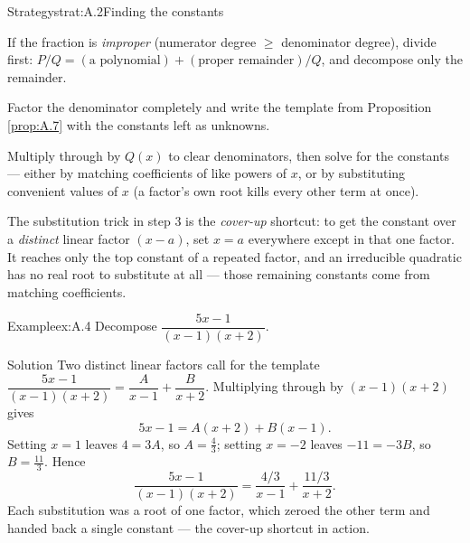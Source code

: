 \documentclass[a4paper,12pt,oneside]{memoir}
\begin{document}
\begin{envstrategy}{Strategy}{strat:A.2}{Finding the constants}
\begin{steps}
  \item If the fraction is \emph{improper} (numerator degree \(\ge\) denominator degree), divide first: \(P/Q = (\text{a polynomial}) + (\text{proper remainder})/Q\), and decompose only the remainder.
  \item Factor the denominator completely and write the template from Proposition \ref{prop:A.7} with the constants left as unknowns.
  \item Multiply through by \(Q(x)\) to clear denominators, then solve for the constants — either by matching coefficients of like powers of \(x\), or by substituting convenient values of \(x\) (a factor’s own root kills every other term at once).
\end{steps}
\begin{informal}
The substitution trick in step 3 is the \emph{cover-up} shortcut: to get the constant over a \emph{distinct} linear factor \((x - a)\), set \(x = a\) everywhere except in that one factor. It reaches only the top constant of a repeated factor, and an irreducible quadratic has no real root to substitute at all — those remaining constants come from matching coefficients.
\end{informal}
\end{envstrategy}
\begin{workedexample}
\begin{envexample}{Example}{ex:A.4}{}
Decompose \(\dfrac{5x - 1}{(x - 1)(x + 2)}\).
\end{envexample}
\begin{envsolution}{Solution}{}{}
Two distinct linear factors call for the template \(\dfrac{5x - 1}{(x - 1)(x + 2)} = \dfrac{A}{x - 1} + \dfrac{B}{x + 2}\). Multiplying through by \((x - 1)(x + 2)\) gives \[ 5x - 1 = A(x + 2) + B(x - 1). \] Setting \(x = 1\) leaves \(4 = 3A\), so \(A = \tfrac{4}{3}\); setting \(x = -2\) leaves \(-11 = -3B\), so \(B = \tfrac{11}{3}\). Hence \[ \frac{5x - 1}{(x - 1)(x + 2)} = \frac{4/3}{x - 1} + \frac{11/3}{x + 2}. \] Each substitution was a root of one factor, which zeroed the other term and handed back a single constant — the cover-up shortcut in action.
\end{envsolution}
\end{workedexample}
\end{document}
